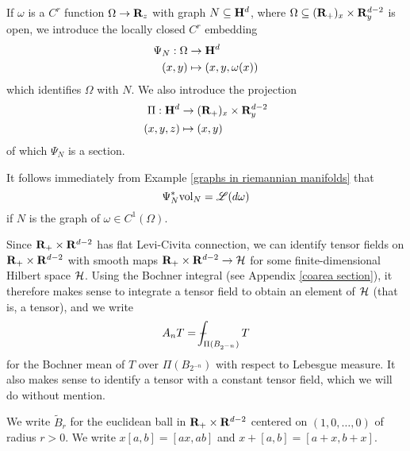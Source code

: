 \begin{notation}\label{hyperbolic line bundle}
If $\omega$ is a $C^r$ function $\Omega \to \mathbf{R}_z$ with graph $N \subseteq \mathbf H^d$, where $\Omega \subseteq (\mathbf{R}_+)_x \times \mathbf{R}^{d - 2}_y$ is open, we introduce the locally closed $C^r$ embedding
\begin{align*}
    \Psi_N: \Omega &\to \mathbf H^d \\
    (x, y) &\mapsto (x, y, \omega(x))
\end{align*}
which identifies $\Omega$ with $N$.
We also introduce the projection
\begin{align*}
    \Pi: \mathbf H^d &\to (\mathbf{R}_+)_x \times \mathbf{R}^{d - 2}_y\\
    (x, y, z) &\mapsto (x, y)
\end{align*}
of which $\Psi_N$ is a section.
\end{notation}

It follows immediately from Example \ref{graphs in riemannian manifolds} that
\begin{equation}\label{Lagrangian formula}
\Psi_N^* \mathrm{vol}_N = \mathscr L(d\omega)
\end{equation}
if $N$ is the graph of $\omega \in C^1(\Omega)$.

\begin{notation}
Since $\mathbf{R}_+ \times \mathbf{R}^{d - 2}$ has flat Levi-Civita connection, we can identify tensor fields on $\mathbf{R}_+ \times \mathbf{R}^{d - 2}$ with smooth maps $\mathbf{R}_+ \times \mathbf{R}^{d - 2} \to \mathcal H$ for some finite-dimensional Hilbert space $\mathcal H$.
Using the Bochner integral (see Appendix \ref{coarea section}), it therefore makes sense to integrate a tensor field to obtain an element of $\mathcal H$ (that is, a tensor), and we write
$$A_n T = \dashint_{\Pi(B_{2^{-n}})} T$$
for the Bochner mean of $T$ over $\Pi(B_{2^{-n}})$ with respect to Lebesgue measure.
It also makes sense to identify a tensor with a constant tensor field, which we will do without mention.
\end{notation}

\begin{notation}[miscellany]
We write $\tilde B_r$ for the euclidean ball in $\mathbf{R}_+ \times \mathbf{R}^{d - 2}$ centered on $(1, 0, \dots, 0)$ of radius $r > 0$.
We write $x[a,b] = [ax, ab]$ and $x + [a, b] = [a + x, b + x]$.
\end{notation}

